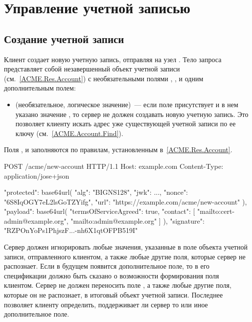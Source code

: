 \section{Управление учетной записью}\label{ACME.Account}

\subsection{Создание учетной записи}\label{ACME.Account.Create}

Клиент создает новую учетную запись, отправляя
 на узел . Тело
запроса представляет собой незавершенный объект учетной записи 
(см.~\ref{ACME.Res.Account}) с необязательными полями , 
,  и одним 
дополнительным полем:

\begin{itemize}
\item
{} (необязательное, логическое значение)~---
если поле присутствует и в нем указано значение , то сервер не 
должен создавать новую учетную запись. Это позволяет клиенту искать адрес уже 
существующей учетной записи по ее ключу (см.~\ref{ACME.Account.Find}).
\end{itemize}

Поля ,  и 
 заполняются по правилам, установленным 
в~\ref{ACME.Res.Account}.

\begin{codeblock}
POST /acme/new-account HTTP/1.1
Host: example.com
Content-Type: application/jose+json

{
  "protected": base64url({
    "alg": "BIGNS128",
    "jwk": {...},
    "nonce": "6S8IqOGY7eL2lsGoTZYifg",
    "url": "https://example.com/acme/new-account"
  }),
  "payload": base64url({
    "termsOfServiceAgreed": true,
    "contact": [
      "mailto:cert-admin@example.org",
      "mailto:admin@example.org"
    ]
  }),
  "signature": "RZPOnYoPs1PhjszF...-nh6X1qtOFPB519I"
}
\end{codeblock}
\fi

Сервер должен игнорировать любые значения, указанные в поле  
объекта учетной записи, отправленного клиентом, а также любые другие поля, 
которые сервер не распознает. 
%
Если в будущем появится дополнительное поле, то в его спецификации должно быть
сказано о возможности формирования поля клиентом.
%
Сервер не должен переносить поле , а также любые другие 
поля, которые он не распознает, в итоговый объект учетной записи. Последнее 
позволяет клиенту определить, поддерживает ли сервер то или иное дополнительное 
поле.

